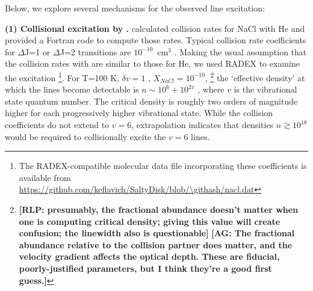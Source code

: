 \documentclass[twocolumn]{aastex62}
\newcommand{\rlp}[1]{\textcolor{blue!65!black}{\textbf{[RLP: #1]}}}
\newcommand{\ag}[1]{\textcolor{red!65!black}{\textbf{[AG: #1]}}}
\begin{document}

Below, we explore several mechanisms for the observed line excitation:

\par{\textbf{(1) Collisional excitation by \hh.}} 
%
%
\citet{Quintana-Lacaci2016a} calculated collision rates for NaCl with He and
provided a Fortran code to compute those rates.  Typical collision rate coefficients for
\hbox{$\Delta$J=1} or \hbox{$\Delta$J=2} transitions are $10^{-10}$~cm$^3$ \pers.  Making the usual
assumption that the collision rates with \hh are similar to those for He, we used
RADEX \citep{Vandertak2007} to examine the excitation \footnote{The
RADEX-compatible molecular data
file incorporating these coefficients is available from
\url{https://github.com/keflavich/SaltyDisk/blob/\githash/nacl.dat}}.
For T=100 K, $\delta v=1$ \kms \perpc, $X_{NaCl}=10^{-10}$,
\footnote{\rlp{presumably,
the fractional abundance doesn't matter when one is computing critical density;
giving this value will create confusion; the linewidth also is questionable}
\ag{The fractional abundance relative to the collision partner does matter,
and the velocity gradient affects the optical depth.  These are fiducial,
poorly-justified parameters, but I think they're a good first guess.}
}
the
`effective density' at which the lines become detectable is $n\sim10^{6} + 
10^{2v}$ \percc, where $v$ is the vibrational state quantum number.  The critical
density is roughly two orders of magnitude higher for each progressively
higher vibrational state.  While the collision coefficients do not extend
to $v=6$, extrapolation indicates that \hh densities
$n\gtrsim10^{18}$ \percc would be required to collisionally excite the $v=6$ lines.
\end{document}
